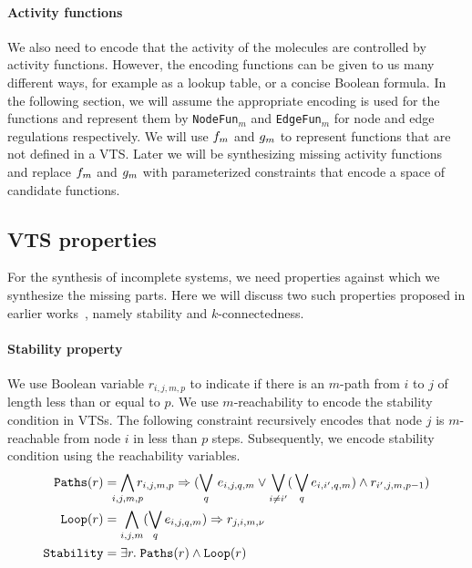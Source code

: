 \paragraph{Activity functions}
We also need to encode that
the activity of the molecules are controlled by activity functions.
%
However, the encoding functions can be given to us many different ways,
for example as a lookup table, or a concise Boolean formula.
%
In the following section, we will assume the appropriate encoding is
used for the functions and represent them by \texttt{NodeFun}$_m$
and \texttt{EdgeFun}$_m$ for node and edge regulations respectively.
%
We will use $f_m$ and $g_m$ to represent functions that
are not defined in a VTS.
%
%
Later we will be synthesizing missing activity functions and 
replace $f_m$ and $g_m$ with parameterized constraints that
encode a space of candidate functions.

\subsection{VTS properties}

For the synthesis of incomplete systems,
we need properties against which we synthesize the missing parts.
%
Here we will discuss two such properties proposed in earlier
works~\cite{smtVTS}, namely stability and $k$-connectedness.
%

\paragraph{Stability property}
%
We use Boolean variable $r_{i,j,m,p}$ to indicate if there is an
$m$-path from $i$ to $j$ of length less than or equal to $p$.
%
We use $m$-reachability to encode the stability condition in VTSs.
%
The following constraint recursively encodes that node $j$ is
$m$-reachable from node $i$ in less than $p$ steps.
%
Subsequently, we encode stability condition using the reachability variables.
\begin{align*}
  \texttt{Paths}(r) &= \bigwedge\limits_{\mathclap{i,j,m,p}} r_{i,j,m,p} \limplies (\bigvee_{q} \, e_{i,j,q,m} \lor \bigvee_{i\neq i^{\prime}} ( \, \bigvee_{q} e_{i,i^{\prime},q,m}) \land r_{i^{\prime},j,m,p-1} )
  \\
  \texttt{Loop}(r) &= \bigwedge\limits_{i,j,m} (\bigvee_{q} e_{i,j,q,m}) \limplies r_{j,i,m,\nu}
  \\
  \texttt{Stability} &= \exists r. \; \texttt{Paths}(r) \land \texttt{Loop}(r)
\end{align*}

